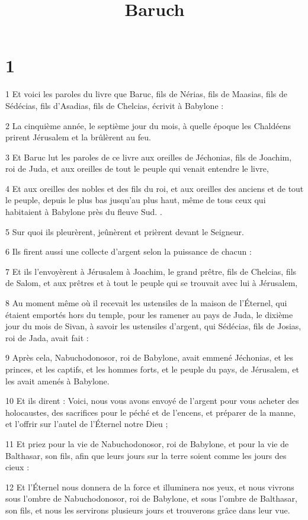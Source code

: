 

\title{Baruch}


\chapter{1}

\par 1 Et voici les paroles du livre que Baruc, fils de Nérias, fils de Maasias, fils de Sédécias, fils d'Asadias, fils de Chelcias, écrivit à Babylone :
\par 2 La cinquième année, le septième jour du mois, à quelle époque les Chaldéens prirent Jérusalem et la brûlèrent au feu.
\par 3 Et Baruc lut les paroles de ce livre aux oreilles de Jéchonias, fils de Joachim, roi de Juda, et aux oreilles de tout le peuple qui venait entendre le livre,
\par 4 Et aux oreilles des nobles et des fils du roi, et aux oreilles des anciens et de tout le peuple, depuis le plus bas jusqu'au plus haut, même de tous ceux qui habitaient à Babylone près du fleuve Sud. .
\par 5 Sur quoi ils pleurèrent, jeûnèrent et prièrent devant le Seigneur.
\par 6 Ils firent aussi une collecte d'argent selon la puissance de chacun :
\par 7 Et ils l'envoyèrent à Jérusalem à Joachim, le grand prêtre, fils de Chelcias, fils de Salom, et aux prêtres et à tout le peuple qui se trouvait avec lui à Jérusalem,
\par 8 Au moment même où il recevait les ustensiles de la maison de l'Éternel, qui étaient emportés hors du temple, pour les ramener au pays de Juda, le dixième jour du mois de Sivan, à savoir les ustensiles d'argent, qui Sédécias, fils de Josias, roi de Jada, avait fait :
\par 9 Après cela, Nabuchodonosor, roi de Babylone, avait emmené Jéchonias, et les princes, et les captifs, et les hommes forts, et le peuple du pays, de Jérusalem, et les avait amenés à Babylone.
\par 10 Et ils dirent : Voici, nous vous avons envoyé de l'argent pour vous acheter des holocaustes, des sacrifices pour le péché et de l'encens, et préparer de la manne, et l'offrir sur l'autel de l'Éternel notre Dieu ;
\par 11 Et priez pour la vie de Nabuchodonosor, roi de Babylone, et pour la vie de Balthasar, son fils, afin que leurs jours sur la terre soient comme les jours des cieux :
\par 12 Et l'Éternel nous donnera de la force et illuminera nos yeux, et nous vivrons sous l'ombre de Nabuchodonosor, roi de Babylone, et sous l'ombre de Balthasar, son fils, et nous les servirons plusieurs jours et trouverons grâce dans leur vue.
